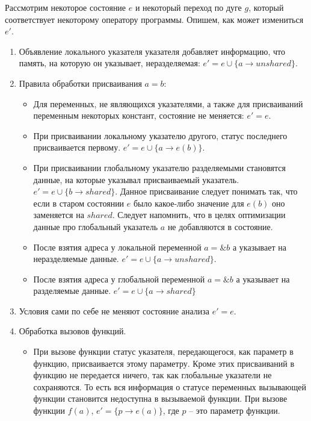 Рассмотрим некоторое состояние $e$ и некоторый переход по дуге $g$, который соответствует некоторому оператору программы. 
Опишем, как может измениться $e'$.

\begin{enumerate}
\item Объявление локального указателя указателя добавляет информацию, что память, на которую он указывает, неразделяемая: $e' = e \cup \{a \to unshared\}$.

\item Правила обработки присваивания $a = b$:
\begin{itemize}

\item Для переменных, не являющихся указателями, а также для присваиваний переменным некоторых констант, состояние не меняется: $e' = e$.

\item При присваивании локальному указателю другого, статус последнего присваивается первому.
$e' = e \cup \{a \to e(b)\}$.

\item При присваивании глобальному указателю разделяемыми становятся данные, на которые указывал присваиваемый указатель.
$e' = e \cup \{b \to shared\}$.
Данное присваивание следует понимать так, что если в старом состоянии $e$ было какое-либо значение для $e(b)$ оно заменяется на $shared$.
Следует напомнить, что в целях оптимизации данные про глобальный указатель $a$ не добавляются в состояние.

\item После взятия адреса у локальной переменной $a = \&b$ $а$ указывает на неразделяемые данные.
$e' = e \cup \{a \to unshared\}$.

\item После взятия адреса у глобальной переменной $a = \&b$ $а$ указывает на разделяемые данные.
$e' = e \cup \{a \to shared\}$
\end{itemize}

\item Условия сами по себе не меняют состояние анализа $e' = e$.

\item Обработка вызовов функций. 
\begin{itemize}
\item При вызове функции статус указателя, передающегося, как параметр в функцию, присваивается этому параметру.
Кроме этих присваиваний в функцию не передается ничего, так как глобальные указатели не сохраняются.
То есть вся информация о статусе переменных вызывающей функции становится недоступна в вызываемой функции.
При вызове функции $f(a)$, $e' = \{p \to e(a)\}$, где $p$ -- это параметр функции.


\end{itemize}
\end{enumerate}
